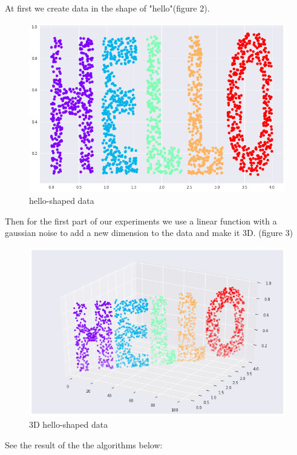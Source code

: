 \documentclass[a4paper]{article}
\begin{document}
At first we create data in the shape of "hello"(figure 2). 
\begin{figure}[H]
\centering
\includegraphics[scale = 0.33]{simple_hello.png}
\caption{\label{fig:simple_hello}hello-shaped data}
\end{figure}
Then for the first part of our experiments we use a linear function with a gaussian noise to add a new dimension to the data and make it 3D. (figure 3)
\begin{figure}[H]
\centering
\includegraphics[scale = 0.33]{3_dhello_linear_gussian.png}
\caption{\label{fig:3_dhello_linear_gussian}3D hello-shaped data}
\end{figure}
\newpage
See the result of the the algorithms below:
\end{document}
